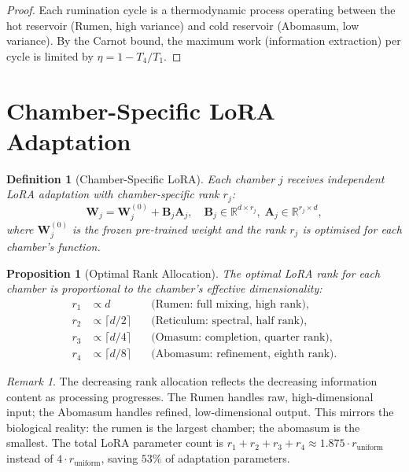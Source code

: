 \documentclass[twocolumn,10pt]{article}
\newtheorem{definition}[theorem]{Definition}
\newtheorem{proposition}[theorem]{Proposition}
\theoremstyle{remark}
\newtheorem{remark}[theorem]{Remark}
\begin{document}
\begin{proof}
Each rumination cycle is a thermodynamic process operating between the hot reservoir (Rumen, high variance) and cold reservoir (Abomasum, low variance).  By the Carnot bound, the maximum work (information extraction) per cycle is limited by $\eta = 1 - T_4/T_1$.
\end{proof}


\section{Chamber-Specific LoRA Adaptation}
\label{sec:lora}

\begin{definition}[Chamber-Specific LoRA]
\label{def:chamber_lora}
Each chamber $j$ receives independent LoRA adaptation \cite{hu2022lora} with chamber-specific rank $r_j$:
\begin{equation}
    \mathbf{W}_j = \mathbf{W}_j^{(0)} + \mathbf{B}_j \mathbf{A}_j, \quad \mathbf{B}_j \in \mathbb{R}^{d \times r_j}, \; \mathbf{A}_j \in \mathbb{R}^{r_j \times d},
    \label{eq:chamber_lora}
\end{equation}
where $\mathbf{W}_j^{(0)}$ is the frozen pre-trained weight and the rank $r_j$ is optimised for each chamber's function.
\end{definition}

\begin{proposition}[Optimal Rank Allocation]
\label{prop:rank}
The optimal LoRA rank for each chamber is proportional to the chamber's effective dimensionality:
\begin{align}
    r_1 &\propto d \quad &\text{(Rumen: full mixing, high rank)}, \\
    r_2 &\propto \lceil d/2 \rceil \quad &\text{(Reticulum: spectral, half rank)}, \\
    r_3 &\propto \lceil d/4 \rceil \quad &\text{(Omasum: completion, quarter rank)}, \\
    r_4 &\propto \lceil d/8 \rceil \quad &\text{(Abomasum: refinement, eighth rank)}.
    \label{eq:rank_allocation}
\end{align}
\end{proposition}

\begin{remark}
The decreasing rank allocation reflects the decreasing information content as processing progresses.  The Rumen handles raw, high-dimensional input; the Abomasum handles refined, low-dimensional output.  This mirrors the biological reality: the rumen is the largest chamber; the abomasum is the smallest.  The total LoRA parameter count is $r_1 + r_2 + r_3 + r_4 \approx 1.875 \cdot r_{\text{uniform}}$ instead of $4 \cdot r_{\text{uniform}}$, saving $53\%$ of adaptation parameters.
\end{remark}
\end{document}

